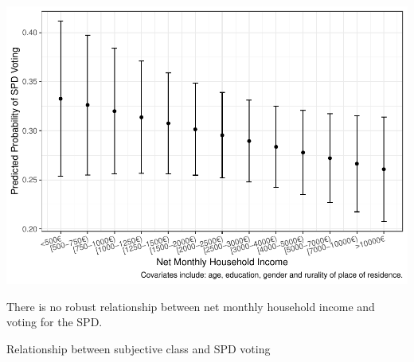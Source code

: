 \documentclass[
]{article}
\begin{document}
\includegraphics{AVCD_Final_Assignment-Edenhofer_files/figure-latex/spd-household-income-1.pdf}

There is no robust relationship between net monthly household income and
voting for the SPD.

Relationship between subjective class and SPD voting
\end{document}
